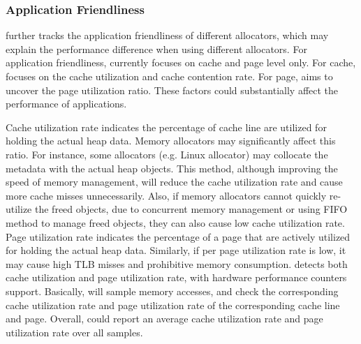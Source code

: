 \subsubsection{Application Friendliness} 
\MP{} further tracks the application friendliness of different allocators, which may explain the performance difference when using different allocators. For application friendliness, \MP{} currently focuses on cache and page level only. For cache, \MP{} focuses on the cache utilization and cache contention rate. For page, \MP{} aims to uncover the page utilization ratio. These factors could substantially affect the performance of applications. 

Cache utilization rate indicates the percentage of cache line are utilized for holding the actual heap data. Memory allocators may significantly affect this ratio. For instance, some allocators (e.g. Linux allocator) may collocate the metadata with the actual heap objects. This method, although improving the speed of memory management, will reduce the cache utilization rate and cause more cache misses unnecessarily. 
Also, if memory allocators cannot quickly re-utilize the freed objects, due to concurrent memory management or using FIFO method to manage freed objects, they can also cause low cache utilization rate. Page utilization rate indicates the percentage of a page that are actively utilized for holding the actual heap data. Similarly, if per page utilization rate is low, it may cause high TLB misses and prohibitive memory consumption. \MP{} detects both cache utilization and page utilization rate, with hardware performance counters support. Basically, \MP{} will sample memory accesses, and check the corresponding cache utilization rate and page utilization rate of the corresponding cache line and page. Overall, \MP{} could report an average cache utilization rate and page utilization rate over all samples. 

